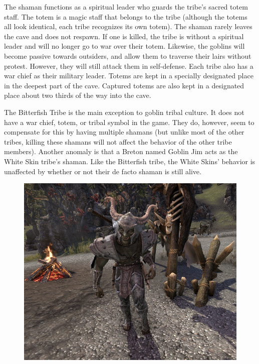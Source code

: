 \documentclass[12pt]{book}
\begin{document}
The shaman functions as a spiritual leader who guards the tribe's sacred totem staff. The totem is a magic staff that belongs to the tribe (although the totems all look identical, each tribe recognizes its own totem). The shaman rarely leaves the cave and does not respawn. If one is killed, the tribe is without a spiritual leader and will no longer go to war over their totem. Likewise, the goblins will become passive towards outsiders, and allow them to traverse their lairs without protest. However, they will still attack them in self-defense. Each tribe also has a war chief as their military leader. Totems are kept in a specially designated place in the deepest part of the cave. Captured totems are also kept in a designated place about two thirds of the way into the cave.

The Bitterfish Tribe is the main exception to goblin tribal culture. It does not have a war chief, totem, or tribal symbol in the game. They do, however, seem to compensate for this by having multiple shamans (but unlike most of the other tribes, killing these shamans will not affect the behavior of the other tribe members). Another anomaly is that a Breton named Goblin Jim acts as the White Skin tribe's shaman. Like the Bitterfish tribe, the White Skins' behavior is unaffected by whether or not their de facto shaman is still alive.

\begin{figure}[h]
	\centering
	\includegraphics[scale=0.75]{goblin.png}
\end{figure}
\end{document}
